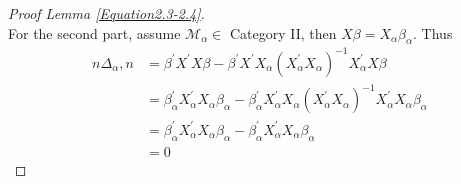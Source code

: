 \documentclass[Research_Module_ES.tex]{subfiles}
\begin{document}
\begin{proof}[Proof Lemma \ref{Equation2.3-2.4}]
	\\
	For the second part, assume $\mathcal{M}_\alpha\in$ Category II, then $X\beta=X_\alpha\beta_\alpha$. Thus
	\begin{align*}
		n\Delta_\alpha,n&=\beta^\prime X^\prime X\beta-\beta^\prime X^\prime X_\alpha \left(X_\alpha^\prime X_\alpha\right)^{-1}X_\alpha^\prime X\beta\\
		&=\beta_\alpha^\prime X_\alpha^\prime X_\alpha \beta_\alpha -\beta_\alpha^\prime X_\alpha^\prime X_\alpha\left(X_\alpha^\prime X_\alpha\right)^{-1} X_\alpha^\prime X_\alpha\beta_\alpha\\
		&=\beta_\alpha^\prime X_\alpha^\prime X_\alpha \beta_\alpha - \beta_\alpha^\prime X_\alpha^\prime X_\alpha \beta_\alpha\\
		&=0
	\end{align*}
	
\end{proof}
\end{document}
